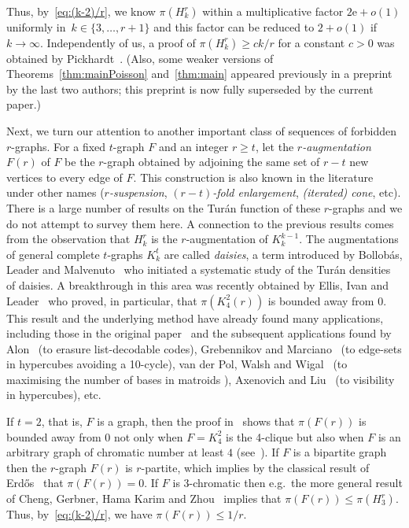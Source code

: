 \documentclass[10pt,a4paper]{article}
\numberwithin{equation}{section}
\theoremstyle{definition}
\theoremstyle{remark}
\newcommand{\me}{\mathrm{e}}
\begin{document}
Thus, by~\eqref{eq:(k-2)/r}, we know $\pi(H_k^r)$ within a multiplicative factor $2\me+o(1)$ uniformly in~$k\in\{3,\dots,r+1\}$ and this factor can be reduced to $2+o(1)$ if $k\to\infty$. Independently of us, a proof of $\pi(H_k^r)\ge ck/r$ for a constant $c>0$ was obtained by Pickhardt~\cite{Pickhardt26}. (Also, some weaker versions of Theorems~\ref{thm:mainPoisson} and~\ref{thm:main} appeared previously  in a preprint~\cite{YangZhu26x} by the last two authors; this preprint is now fully superseded by the current paper.)


Next, we turn our attention to another important class of sequences of forbidden $r$-graphs. 
For a fixed $t$-graph $F$ and an integer $r\ge t$, let the \emph{$r$-augmentation} $F(r)$ of $F$ be the $r$-graph obtained by adjoining the same set of $r-t$ new vertices to every edge of $F$. This construction is also known in the literature under other names (\emph{$r$-suspension}, \emph{$(r-t)$-fold enlargement}, \emph{(iterated) cone}, etc). There is a large number of results on the Tur\'an function of these $r$-graphs and we do not attempt to survey them here. A connection to the previous results comes from the observation that
$H_k^r$ is the $r$-augmentation of $K_{k}^{k-1}$. 
The augmentations of general complete $t$-graphs $K_k^{t}$ are called \emph{daisies}, a term introduced by Bollob\'as, Leader and Malvenuto~\cite{BollobasLeaderMalvenuto11} who initiated a systematic study of the Tur\'an densities of daisies.
A breakthrough in this area was recently obtained by Ellis, Ivan and Leader~\cite[Theorem~4]{EllisIvanLeader24} who proved, in particular, that $\pi(K_{4}^2(r))$ is bounded away from 0.
This result and the underlying method have already found many applications, including those in the original paper~\cite{EllisIvanLeader24} and the subsequent applications found by Alon~\cite{Alon24} (to erasure list-decodable codes),  Grebennikov and Marciano~\cite{GrebennikovMarciano25} (to edge-sets in hypercubes avoiding a 10-cycle), van der Pol, Walsh and Wigal~\cite{PolWalshWigal25} (to maximising the number of bases in matroids%
), Axenovich and Liu~\cite{AxenovichLiu26} (to visibility in hypercubes), etc.

If $t=2$, that is, $F$ is a graph, then the proof in~\cite{EllisIvanLeader24} shows that $\pi(F(r))$ is bounded away from $0$ not only when $F=K_4^2$ is the 4-clique but also when $F$ is an arbitrary graph of chromatic number at least $4$ (see~\cite[Page~3852]{EllisIvanLeader24}). If $F$ is a bipartite graph then the $r$-graph $F(r)$ is $r$-partite, which implies by the classical result of Erd\H os~\cite{Erdos64} that $\pi(F(r))=0$. If $F$ is $3$-chromatic then e.g.\ the more general result of
Cheng, Gerbner, Hama Karim and Zhou~\cite[Theorem 1.2]{ChengGerbnerHamaKarimZhou26} 
implies that $\pi(F(r))\le \pi(H_3^r)$. Thus, by~\eqref{eq:(k-2)/r}, we have $\pi(F(r))\le 1/r$. 
\end{document}
